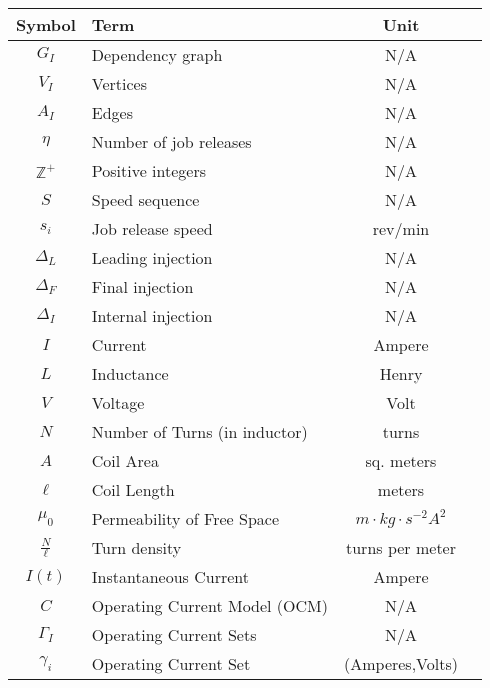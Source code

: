 \begin{center}
\bgroup
\begin{tabular}{| c | l | c | c |}
    \hline
    Symbol & Term & Unit \\  \hline \hline \cline{1-3}
    $G_I$ & Dependency graph & N/A \\ \cline{1-3}
    $V_I$ & Vertices & N/A \\ \cline{1-3}
    $A_I$ & Edges & N/A \\ \cline{1-3}
    $\eta$ & Number of job releases & N/A \\ \cline{1-3}
    $\mathbb{Z}^+$ & Positive integers & N/A \\ \cline{1-3}
    $S$ & Speed sequence & N/A \\ \cline{1-3}
    $s_i$ & Job release speed & rev/min \\ \cline{1-3}
    $\Delta_L$ & Leading injection & N/A \\ \cline{1-3}
    $\Delta_F$ & Final injection & N/A \\ \cline{1-3}
    $\Delta_I$ & Internal injection & N/A \\ \cline{1-3}
    $I$ & Current & Ampere\\ \cline{1-3}
    $L$ & Inductance & Henry\\ \cline{1-3}
    $V$ & Voltage & Volt\\ \cline{1-3}
    $N$ & Number of Turns (in inductor) & turns\\ \cline{1-3}
    $A$ & Coil Area & sq. meters\\ \cline{1-3}
    $\ell$ & Coil Length & meters \\ \cline{1-3}
    $\mu_0$ & Permeability of Free Space & $m \cdot kg \cdot s^{-2} A^{2}$\\ \cline{1-3}
    $\frac{N}{\ell}$ & Turn density & turns per meter\\ \cline{1-3}
    $I(t)$ & Instantaneous Current & Ampere\\ \cline{1-3}
    $C$ & Operating Current Model (OCM) & N/A\\ \cline{1-3}
    $\Gamma_I$ & Operating Current Sets & N/A\\ \cline{1-3}
    $\gamma_i$ & Operating Current Set & (Amperes,Volts)\\ \cline{1-3}
    \hline
\end{tabular}
\egroup
\end{center}

